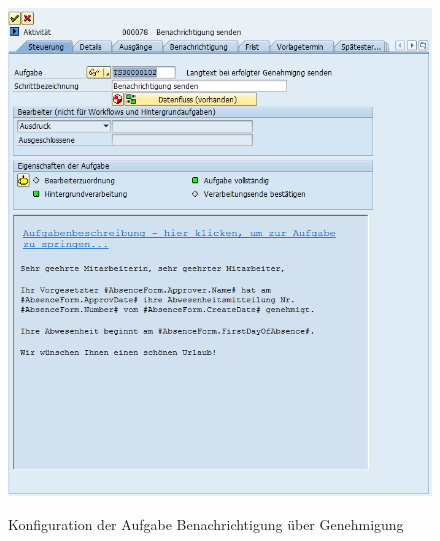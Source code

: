 \begin{figure}[H]
	\begin{center}
	\includegraphics[width=1.0\textwidth]{grafiken/wf-builder_bsp2_act_message-genehmigt.png}
	\caption{Konfiguration der Aufgabe Benachrichtigung über Genehmigung}
	\vspace{-10pt}
	\label{abb:workflow-bsp2-act_message-genehmigt}
	\end{center}
\end{figure}

